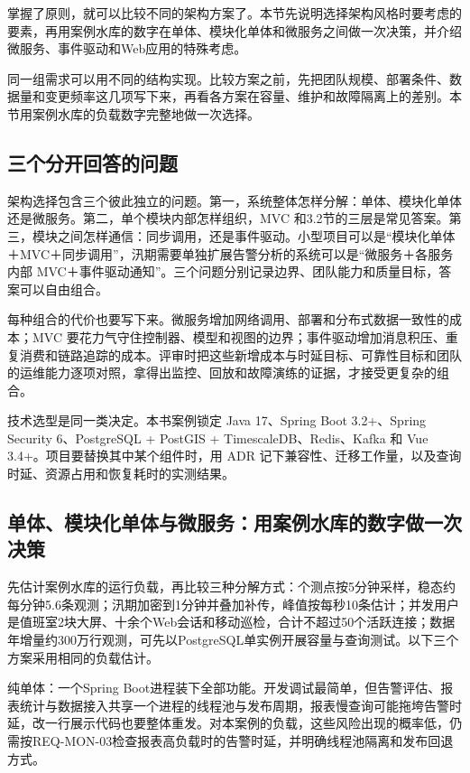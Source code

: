 掌握了原则，就可以比较不同的架构方案了。本节先说明选择架构风格时要考虑的要素，再用案例水库的数字在单体、模块化单体和微服务之间做一次决策，并介绍微服务、事件驱动和Web应用的特殊考虑。

同一组需求可以用不同的结构实现。比较方案之前，先把团队规模、部署条件、数据量和变更频率这几项写下来，再看各方案在容量、维护和故障隔离上的差别。本节用案例水库的负载数字完整地做一次选择。

\subsection{三个分开回答的问题}

架构选择包含三个彼此独立的问题。第一，系统整体怎样分解：单体、模块化单体还是微服务。第二，单个模块内部怎样组织，MVC 和3.2节的三层是常见答案。第三，模块之间怎样通信：同步调用，还是事件驱动。小型项目可以是“模块化单体＋MVC＋同步调用”，汛期需要单独扩展告警分析的系统可以是“微服务＋各服务内部 MVC＋事件驱动通知”。三个问题分别记录边界、团队能力和质量目标，答案可以自由组合。

每种组合的代价也要写下来。微服务增加网络调用、部署和分布式数据一致性的成本；MVC 要花力气守住控制器、模型和视图的边界；事件驱动增加消息积压、重复消费和链路追踪的成本。评审时把这些新增成本与时延目标、可靠性目标和团队的运维能力逐项对照，拿得出监控、回放和故障演练的证据，才接受更复杂的组合。

技术选型是同一类决定。本书案例锁定 Java 17、Spring Boot 3.2+、Spring Security 6、PostgreSQL + PostGIS + TimescaleDB、Redis、Kafka 和 Vue 3.4+。项目要替换其中某个组件时，用 ADR 记下兼容性、迁移工作量，以及查询时延、资源占用和恢复耗时的实测结果。

\subsection{单体、模块化单体与微服务：用案例水库的数字做一次决策}\label{sec:ch03-load-estimate}

先估计案例水库的运行负载，再比较三种分解方式：\cpStationCount 个测点按5分钟采样，稳态约每分钟5.6条观测；汛期加密到1分钟并叠加补传，峰值按每秒10条估计；并发用户是值班室2块大屏、十余个Web会话和移动巡检，合计不超过50个活跃连接；数据年增量约300万行观测，可先以PostgreSQL单实例开展容量与查询测试。以下三个方案采用相同的负载估计。

纯单体：一个Spring Boot进程装下全部功能。开发调试最简单，但告警评估、报表统计与数据接入共享一个进程的线程池与发布周期，报表慢查询可能拖垮告警时延，改一行展示代码也要整体重发。对本案例的负载，这些风险出现的概率低，仍需按REQ-MON-03检查报表高负载时的告警时延，并明确线程池隔离和发布回退方式。

